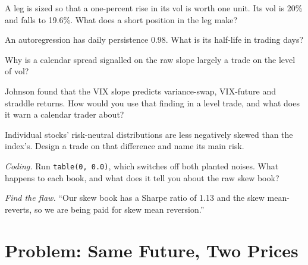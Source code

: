 \begin{exercise}[$\star$]\label{exo:s2:skew-and-term-structure-relative-value:2}
A leg is sized so that a one-percent rise in its vol is worth one unit. Its vol is 20\% and falls to 19.6\%. What does a short position in the leg make?
\end{exercise}

\begin{exercise}[$\star$]\label{exo:s2:skew-and-term-structure-relative-value:3}
An autoregression has daily persistence 0.98. What is its half-life in trading days?
\end{exercise}

\begin{exercise}[$\star\star$]\label{exo:s2:skew-and-term-structure-relative-value:4}
Why is a calendar spread signalled on the raw slope largely a trade on the level of vol?
\end{exercise}

\begin{exercise}[$\star\star$]\label{exo:s2:skew-and-term-structure-relative-value:5}
Johnson found that the VIX slope predicts variance-swap, VIX-future and straddle returns. How would you use that finding in a level trade, and what does
it warn a calendar trader about?
\end{exercise}

\begin{exercise}[$\star\star$]\label{exo:s2:skew-and-term-structure-relative-value:6}
Individual stocks' risk-neutral distributions are less negatively skewed than the index's. Design a trade on that difference and name its main risk.
\end{exercise}

\begin{exercise}[$\star\star\star$]\label{exo:s2:skew-and-term-structure-relative-value:7}
\emph{Coding.} Run \texttt{table(0, 0.0)}, which switches off both planted noises. What happens to each book, and what does it tell you about the raw
skew book?
\end{exercise}

\begin{exercise}[$\star\star\star$]\label{exo:s2:skew-and-term-structure-relative-value:8}
\emph{Find the flaw.} ``Our skew book has a Sharpe ratio of 1.13 and the skew mean-reverts, so we are being paid for skew mean reversion.''
\end{exercise}

\section{Problem: Same Future, Two Prices}

